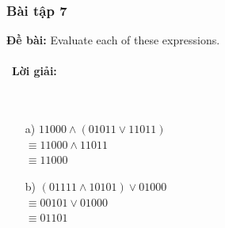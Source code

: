 \documentclass[a4paper]{article}
\begin{document}
\subsubsection{Bài tập 7}
\textbf{Đề bài:} Evaluate each of these expressions.
\\\ \\\
\textbf{Lời giải:} \\\ \\\
	\begin{enumerate}
		\item [a)]
		$11000 \land (01011 \lor 11011)$\\$\equiv11000 \land 11011$\\$\equiv11000$
		\item [b)]
		$(01111 \land 10101) \lor 01000$\\$\equiv 00101 \lor 01000$\\ $\equiv 01101$\\
	\end{enumerate}
\clearpage
\end{document}
